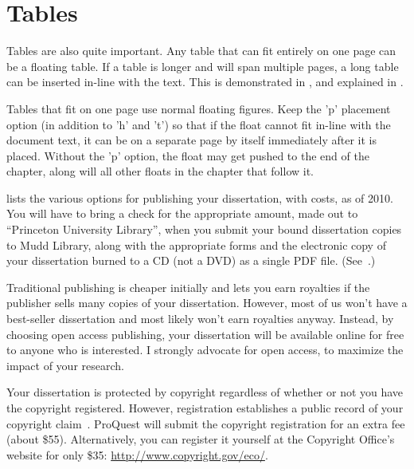 \section{Tables}
\label{sec:pastwork:tables}

Tables are also quite important. Any table that can fit entirely on one page can be a floating table. If a table is longer and will span multiple pages, a long table can be inserted in-line with the text. This is demonstrated in , and explained in .

Tables that fit on one page use normal floating figures. Keep the 'p' placement option (in addition to 'h' and 't') so that if the float cannot fit in-line with the document text, it can be on a separate page by itself immediately after it is placed. Without the 'p' option, the float may get pushed to the end of the chapter, along will all other floats in the chapter that follow it.

 lists the various options for publishing your dissertation, with costs, as of 2010. You will have to bring a check for the appropriate amount, made out to ``Princeton University Library'', when you submit your bound dissertation copies to Mudd Library, along with the appropriate forms and the electronic copy of your dissertation burned to a CD (not a DVD) as a single PDF file. (See~\cite{muddthesis2019}.)

Traditional publishing is cheaper initially and lets you earn royalties if the publisher sells many copies of your dissertation. However, most of us won't have a best-seller dissertation and most likely won't earn royalties anyway. Instead, by choosing open access publishing, your dissertation will be available online for free to anyone who is interested. I strongly advocate for open access, to maximize the impact of your research.

Your dissertation is protected by copyright regardless of whether or not you have the copyright registered. However, registration establishes a public record of your copyright claim~\cite{muddthesis2019}. ProQuest will submit the copyright registration for an extra fee (about \$55). Alternatively, you can register it yourself at the Copyright Office's website for only \$35: \url{http://www.copyright.gov/eco/}.

